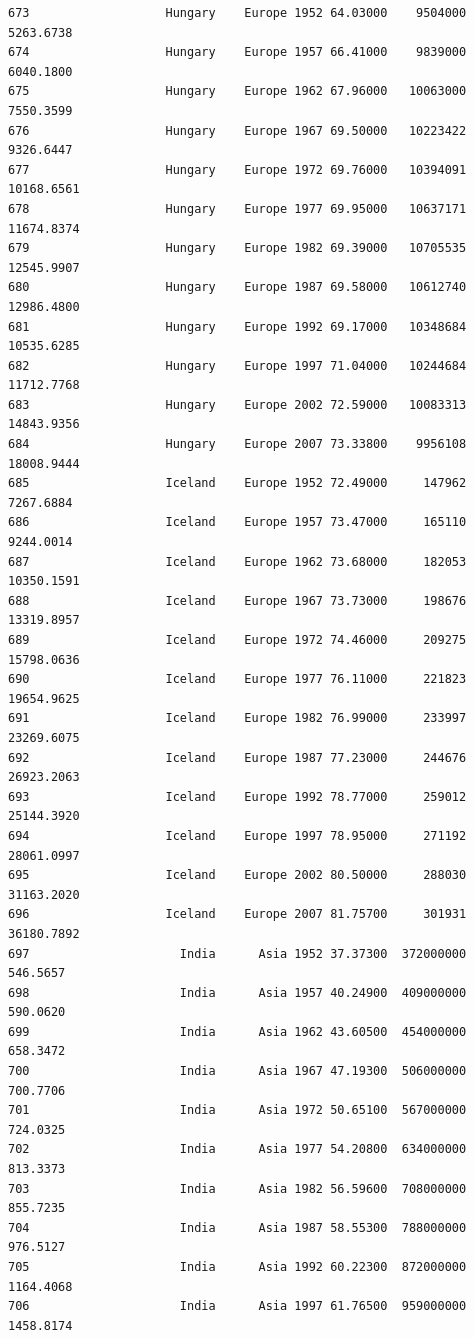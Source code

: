 \documentclass[
  letterpaper,
  DIV=11,
  numbers=noendperiod]{scrreprt}
\begin{document}
\begin{verbatim}
673                   Hungary    Europe 1952 64.03000    9504000   5263.6738
674                   Hungary    Europe 1957 66.41000    9839000   6040.1800
675                   Hungary    Europe 1962 67.96000   10063000   7550.3599
676                   Hungary    Europe 1967 69.50000   10223422   9326.6447
677                   Hungary    Europe 1972 69.76000   10394091  10168.6561
678                   Hungary    Europe 1977 69.95000   10637171  11674.8374
679                   Hungary    Europe 1982 69.39000   10705535  12545.9907
680                   Hungary    Europe 1987 69.58000   10612740  12986.4800
681                   Hungary    Europe 1992 69.17000   10348684  10535.6285
682                   Hungary    Europe 1997 71.04000   10244684  11712.7768
683                   Hungary    Europe 2002 72.59000   10083313  14843.9356
684                   Hungary    Europe 2007 73.33800    9956108  18008.9444
685                   Iceland    Europe 1952 72.49000     147962   7267.6884
686                   Iceland    Europe 1957 73.47000     165110   9244.0014
687                   Iceland    Europe 1962 73.68000     182053  10350.1591
688                   Iceland    Europe 1967 73.73000     198676  13319.8957
689                   Iceland    Europe 1972 74.46000     209275  15798.0636
690                   Iceland    Europe 1977 76.11000     221823  19654.9625
691                   Iceland    Europe 1982 76.99000     233997  23269.6075
692                   Iceland    Europe 1987 77.23000     244676  26923.2063
693                   Iceland    Europe 1992 78.77000     259012  25144.3920
694                   Iceland    Europe 1997 78.95000     271192  28061.0997
695                   Iceland    Europe 2002 80.50000     288030  31163.2020
696                   Iceland    Europe 2007 81.75700     301931  36180.7892
697                     India      Asia 1952 37.37300  372000000    546.5657
698                     India      Asia 1957 40.24900  409000000    590.0620
699                     India      Asia 1962 43.60500  454000000    658.3472
700                     India      Asia 1967 47.19300  506000000    700.7706
701                     India      Asia 1972 50.65100  567000000    724.0325
702                     India      Asia 1977 54.20800  634000000    813.3373
703                     India      Asia 1982 56.59600  708000000    855.7235
704                     India      Asia 1987 58.55300  788000000    976.5127
705                     India      Asia 1992 60.22300  872000000   1164.4068
706                     India      Asia 1997 61.76500  959000000   1458.8174

\end{verbatim}
\end{document}
